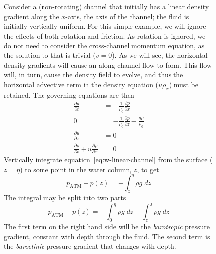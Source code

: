 \documentclass[11pt]{report}
\numberwithin{equation}{section}
\begin{document}
\begin{figure}
Consider a (non-rotating) channel that initially has a linear density gradient along the $x$-axis, the axis of the channel; the fluid is initially vertically uniform.  For this simple example, we will ignore the effects of both rotation and friction.  As rotation is ignored, we do not need to consider the cross-channel momentum equation, as the solution to that is trivial ($v=0$).  As we will see, the horizontal density gradients will cause an along-channel flow to form.  This flow will, in turn, cause the density field to evolve, and thus the horizontal advective term in the density equation ($u \rho_x$) must be retained.  The governing equations are then
\begin{align}
    \frac{\partial u}{\partial t} 
        &= -\frac{1}{\rho_0}\frac{\partial p}{\partial x} \label{eq:u-linear-channel} \\
    0  &= -\frac{1}{\rho_0}\frac{\partial p}{\partial z} 
                   -\frac{g \rho}{\rho_0} \label{eq:w-linear-channel} \\
    \frac{\partial u}{\partial x} &= 0 \label{eq:cont-linear-channel}\\
    \frac{\partial \rho}{\partial t} + u\frac{\partial \rho}{\partial x} &= 0 \label{eq:dens-linear-channel}
\end{align}
Vertically integrate equation~\ref{eq:w-linear-channel} from the surface ($z=\eta$) to some point in the water column, $z$, to get
\begin{equation}
    p_{\mathrm{ATM}} - p(z) = - \int_z^\eta \rho g\;dz
\end{equation}
The integral may be split into two parts
\begin{equation}
    p_{\mathrm{ATM}} - p(z) = - \int_0^\eta \rho g\;dz - \int_z^0 \rho g\;dz
\end{equation}
The first term on the right hand side will be the \emph{barotropic} pressure gradient, constant with depth through the fluid.  The second term is the \emph{baroclinic} pressure gradient that changes with depth.  


\end{figure}
\end{document}
